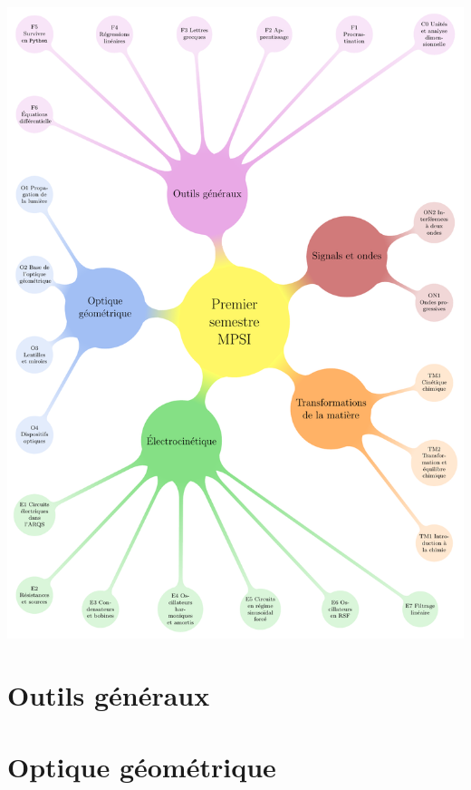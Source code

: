 \documentclass[a4paper, 12pt, garamond]{book}
\begin{document}
\begin{adjustwidth}{-1cm}{-1cm}
	\pagestyle{empty}
	\includegraphics[width=\linewidth]{coverS1}
\end{adjustwidth}
\newpage

\tableofcontents
\listoffigures
\listoftables
\part{Outils généraux}



% 




\part{Optique géométrique}




\end{document}
